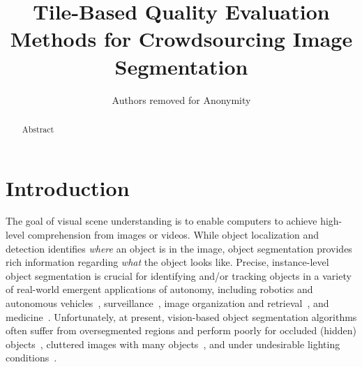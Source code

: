 \documentclass[letterpaper]{article} %
\begin{document}

%

\newcommand{\agp}[1]{\textcolor{magenta}{Aditya: #1}}


\title{Tile-Based Quality Evaluation Methods for Crowdsourcing Image Segmentation}
\author{Authors removed for Anonymity}
\maketitle
\begin{abstract}
Abstract
\end{abstract}

\section{Introduction}

\par The goal of visual scene understanding is 
to enable computers to achieve high-level comprehension 
from images or videos. While object localization and detection 
identifies \textit{where} an object is in the image, 
object segmentation provides rich information 
regarding \textit{what} the object looks like. 
Precise, instance-level object segmentation  
is crucial for identifying and/or tracking objects in a variety
of real-world emergent applications of autonomy, including
robotics and autonomous vehicles~\cite{XXX},
surveillance~\cite{xxx}, image organization and retrieval~\cite{Yamaguchi2012},
and medicine~\cite{Irshad2014}.
Unfortunately, at present, vision-based object segmentation
algorithms often suffer from oversegmented regions and perform poorly
for occluded (hidden) objects~\cite{Torralba2010},
cluttered images with many objects~\cite{Russakovsky2015},
and under undesirable lighting conditions~\cite{bell15minc}.
\end{document}
